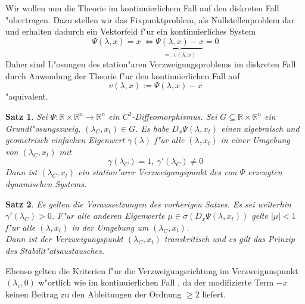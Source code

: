 \documentclass[a4paper, 13pt]{scrreprt}
\newtheorem{satz}{Satz}[section]
\theoremstyle{definition} \newtheorem{definition}{Definition}[section]
\newcommand{\RR}{\mathbb{R}}
\begin{document}
Wir wollen nun die Theorie im kontinuierlichem Fall auf den diskreten Fall "ubertragen. Dazu stellen wir das Fixpunktproblem, als Nullstellenproblem dar und erhalten dadurch ein Vektorfeld f"ur ein kontinuierliches System
\[\Psi(\lambda,x)=x \ \Leftrightarrow \underbrace{\Psi(\lambda,x)-x}_{=:v(\lambda,x)}=0\]
Daher sind L"osungen des station"aren Verzweigungsproblems im diskreten Fall durch Anwendung der Theorie f"ur den kontinuierlichen Fall auf 
\[v(\lambda,x):=\Psi(\lambda,x)-x\]
"aquivalent.

\begin{satz}
Sei $\Psi\colon\RR\times\RR^n\to\RR^n$ ein $C^2$-Diffeomorphismus. Sei $G\subseteq \RR\times\RR^n$ ein Grundl"osungszweig, $(\lambda_C, x_t)\in G$. Es habe $D_x \Psi(\lambda, x_t)$ einen algebraisch und geometrisch einfachen Eigenwert $\gamma(\lambda)$ f"ur alle $(\lambda, x_t)$ in einer Umgebung von $(\lambda_C, x_t)$ mit
$$ \gamma(\lambda_C) = 1 , \  \gamma'(\lambda_C) \neq 0$$
Dann ist $(\lambda_C, x_t)$ ein station"arer Verzweigungspunkt des von $\Psi$ erzeugten dynamischen Systems.
\end{satz}

\begin{satz}
Es gelten die Voraussetzungen des vorherigen Satzes. Es sei weiterhin $\gamma'(\lambda_C) > 0$. F"ur alle \emph{anderen} Eigenwerte $\mu \in \sigma(D_x \Psi(\lambda, x_t))$ gelte $|\mu|< 1$ f"ur alle $(\lambda, x_t)$ in der Umgebung um $(\lambda_C, x_t)$.\\
Dann ist der Verzweigungspunkt $(\lambda_C, x_t)$ transkritisch und es gilt das \emph{Prinzip des Stabilit"atsaustausches}.
\end{satz}

Ebenso gelten die Kriterien f"ur die Verzweigungsrichtung im Verzweigunspunkt $(\lambda_c,0)$ w"ortlich wie im kontinuierlichen Fall , da der modifizierte Term $-x$ keinen Beitrag zu den Ableitungen der Ordnung $\geq 2$ liefert.
\end{document}
